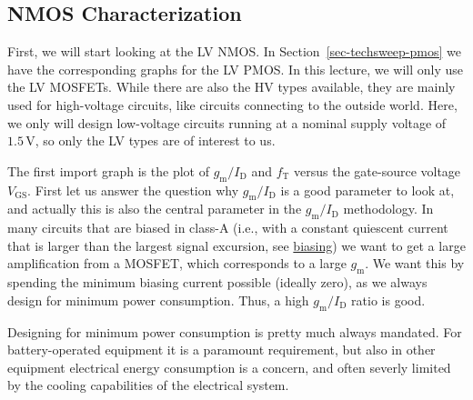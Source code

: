 \documentclass[
  a4paper,
  DIV=11,
  numbers=noendperiod]{scrartcl}
\begin{document}
\subsection{NMOS Characterization}\label{sec-techsweep-nmos}

First, we will start looking at the LV NMOS. In
Section~\ref{sec-techsweep-pmos} we have the corresponding graphs for
the LV PMOS. In this lecture, we will only use the LV MOSFETs. While
there are also the HV types available, they are mainly used for
high-voltage circuits, like circuits connecting to the outside world.
Here, we only will design low-voltage circuits running at a nominal
supply voltage of \(1.5\,\text{V}\), so only the LV types are of
interest to us.

The first import graph is the plot of \(g_\mathrm{m}/I_\mathrm{D}\) and
\(f_\mathrm{T}\) versus the gate-source voltage \(V_\mathrm{GS}\). First
let us answer the question why \(g_\mathrm{m}/I_\mathrm{D}\) is a good
parameter to look at, and actually this is also the central parameter in
the \(g_\mathrm{m}/I_\mathrm{D}\) methodology. In many circuits that are
biased in class-A (i.e., with a constant quiescent current that is
larger than the largest signal excursion, see
\href{https://en.wikipedia.org/wiki/Power_amplifier_classes\#Class_A}{biasing})
we want to get a large amplification from a MOSFET, which corresponds to
a large \(g_\mathrm{m}\). We want this by spending the minimum biasing
current possible (ideally zero), as we always design for minimum power
consumption. Thus, a high \(g_\mathrm{m}/I_\mathrm{D}\) ratio is good.

\begin{tcolorbox}[enhanced jigsaw, breakable, title=\textcolor{quarto-callout-note-color}{\faInfo}\hspace{0.5em}{Power Consumption}, left=2mm, bottomrule=.15mm, opacitybacktitle=0.6, opacityback=0, colframe=quarto-callout-note-color-frame, leftrule=.75mm, bottomtitle=1mm, colbacktitle=quarto-callout-note-color!10!white, toprule=.15mm, rightrule=.15mm, toptitle=1mm, titlerule=0mm, arc=.35mm, colback=white, coltitle=black]

Designing for minimum power consumption is pretty much always mandated.
For battery-operated equipment it is a paramount requirement, but also
in other equipment electrical energy consumption is a concern, and often
severly limited by the cooling capabilities of the electrical system.

\end{tcolorbox}
\end{document}
